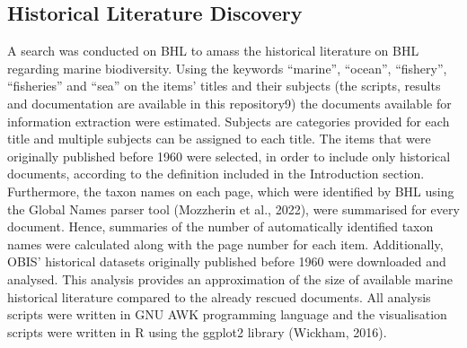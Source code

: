     \subsection{Historical Literature Discovery}
A search was conducted on BHL to amass the historical literature on BHL regarding marine biodiversity. Using the keywords “marine”, “ocean”, “fishery”, “fisheries” and “sea” on the items’ titles and their subjects (the scripts, results and documentation are available in this repository9) the documents available for information extraction were estimated. Subjects are categories provided for each title and multiple subjects can be assigned to each title. The items that were originally published before 1960 were selected, in order to include only historical documents, according to the definition included in the Introduction section. Furthermore, the taxon names on each page, which were identified by BHL using the Global Names parser tool (Mozzherin et al., 2022), were summarised for every document. Hence, summaries of the number of automatically identified taxon names were calculated along with the page number for each item. Additionally, OBIS’ historical datasets originally published before 1960 were downloaded and analysed. This analysis provides an approximation of the size of available marine historical literature compared to the already rescued documents. All analysis scripts were written in GNU AWK programming language and the visualisation scripts were written in R using the ggplot2 library (Wickham, 2016).


